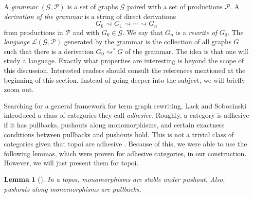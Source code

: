 \documentclass[11pt]{amsart}
\newtheorem{lem}[thm]{Lemma}
\theoremstyle{remark}
\theoremstyle{definition}
\begin{document}
A \emph{grammar} $(\mathcal{G},\mathcal{P})$ is a set of graphs $\mathcal{G}$ paired with a 
set of productions $\mathcal{P}$. A \textit{derivation of the grammar} is a string of direct derivations 
\[
	G_0 \rightsquigarrow G_1 \rightsquigarrow \dotsm \rightsquigarrow G_n
\] 
from productions in $\mathcal{P}$ and with $G_0 \in \mathcal{G}$. We say that $G_n$ is a \emph{rewrite of $G_0$}. The \textit{language} $\mathcal{L}(\mathcal{G},\mathcal{P})$ generated by the grammar is the collection of all graphs $G$ such that there is a derivation $G_0 \rightsquigarrow^\ast G$ of the grammar. The idea is that one will study a language. Exactly what properties are interesting is beyond the scope of this discussion.  Interested readers should consult the references mentioned at the beginning of this section.  Instead of going deeper into the subject, we will briefly zoom out.
%
%
%
%
%
%

Searching for a general framework for term graph rewriting, Lack and Sobocinski \cite{LackSoboc_AdhesiveCategories} introduced a class of categories they call \emph{adhesive}. Roughly, a category is adhesive if it has pullbacks, pushouts along monomorphisms, and certain exactness conditions between pullbacks and pushouts hold. This is not a trivial class of categories given that topoi are adhesive \cite{LackSoboc_ToposesAdhesive}. Because of this, we were able to use the following lemmas, which were proven for adhesive categories, in our construction. However, we will just present them for topoi.                                 
%
%
%
%
%
%

\begin{lem}[{\cite[Lemmas 
		4.2-3]{LackSoboc_AdhesiveCategories}}]
	\label{lem.adhesive properties}
	In a topos, monomorphisms are stable under 	pushout. Also, pushouts along monomorphisms 
	are pullbacks.
\end{lem}
%
%
%
%
%
%
\end{document}
